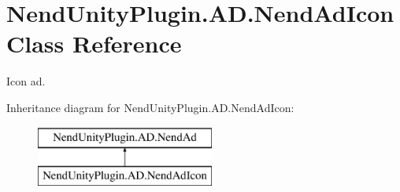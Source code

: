 \hypertarget{class_nend_unity_plugin_1_1_a_d_1_1_nend_ad_icon}{}\section{Nend\+Unity\+Plugin.\+A\+D.\+Nend\+Ad\+Icon Class Reference}
\label{class_nend_unity_plugin_1_1_a_d_1_1_nend_ad_icon}


Icon ad.  


Inheritance diagram for Nend\+Unity\+Plugin.\+A\+D.\+Nend\+Ad\+Icon\+:\begin{figure}[H]
\begin{center}
\leavevmode
\includegraphics[height=2.000000cm]{class_nend_unity_plugin_1_1_a_d_1_1_nend_ad_icon}
\end{center}
\end{figure}
